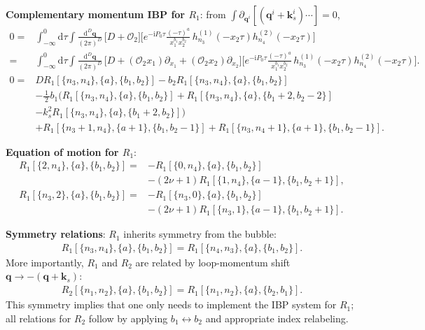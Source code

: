 \documentclass[a4paper,12pt]{article}
\newcommand{\FR}[2]{\displaystyle\frac{\,{#1}\,}{#2}}
\def\di{{\mathrm{d}}}
\def\pd{\partial}
\def\ii{\mathrm{i}}
\def\to{\rightarrow}
\begin{document}
\textbf{Complementary momentum IBP for $R_1$}:
from $\int \pd_{\bm q^i}[(\bm q^i+\bm k_s^i)\cdots]=0$,
\begin{align}
	0 ={}& \int_{-\infty}^0 \di\tau\int \FR{\di^D \bm q}{(2\pi)^D}\,
	\Big[D+\mathcal{O}_2\Big]\Bigg[
	e^{-\ii P_0\tau}\frac{(-\tau)^{a}}{x_1^{b_1}x_2^{b_2}}\,
	h_{n_3}^{(1)}(-x_2\tau)h_{n_4}^{(2)}(-x_2\tau)\Bigg] \nonumber\\
	={}& \int_{-\infty}^0 \di\tau\int \FR{\di^D \bm q}{(2\pi)^D}\,
	\Big[D+(\mathcal{O}_2 x_1)\partial_{x_1}+(\mathcal{O}_2 x_2)\partial_{x_2}\Big]\Bigg[
	e^{-\ii P_0\tau}\frac{(-\tau)^{a}}{x_1^{b_1}x_2^{b_2}}\,
	h_{n_3}^{(1)}(-x_2\tau)h_{n_4}^{(2)}(-x_2\tau)\Bigg]. \label{eq:R1momIBP2_chainrule}
\end{align}
\begin{align}
	0 = & D R_1[\{n_3,n_4\},\{a\},\{b_1,b_2\}] - b_2 R_1[\{n_3,n_4\},\{a\},\{b_1,b_2\}] \nonumber                    \\
	    & - \FR12 b_1\Big( R_1[\{n_3,n_4\},\{a\},\{b_1,b_2\}] + R_1[\{n_3,n_4\},\{a\},\{b_1+2,b_2-2\}] \nonumber     \\
	    & -k_s^2 R_1[\{n_3,n_4\},\{a\},\{b_1+2,b_2\}] \Big) \nonumber                                                \\
	    & + R_1[\{n_3+1,n_4\},\{a+1\},\{b_1,b_2-1\}] + R_1[\{n_3,n_4+1\},\{a+1\},\{b_1,b_2-1\}]. \label{eq:R1momIBP2}
\end{align}

\textbf{Equation of motion for $R_1$}:
\begin{align}
	R_1[\{2,n_4\},\{a\},\{b_1,b_2\}] = & - R_1[\{0,n_4\},\{a\},\{b_1,b_2\}] \nonumber                            \\
	                                   & - (2\nu+1) R_1[\{1,n_4\},\{a-1\},\{b_1,b_2+1\}], \label{eq:R1eom1} \\
	R_1[\{n_3,2\},\{a\},\{b_1,b_2\}] = & - R_1[\{n_3,0\},\{a\},\{b_1,b_2\}] \nonumber                            \\
	                                   & - (2\nu+1) R_1[\{n_3,1\},\{a-1\},\{b_1,b_2+1\}]. \label{eq:R1eom2}
\end{align}

\textbf{Symmetry relations}: $R_1$ inherits symmetry from the bubble:
\begin{align}
	 R_1[\{n_3,n_4\},\{a\},\{b_1,b_2\}] = R_1[\{n_4,n_3\},\{a\},\{b_1,b_2\}] \label{eq:R1sym}. 
\end{align}	 
	 More importantly, $R_1$ and $R_2$ are related by loop-momentum shift $\bm q \to -(\bm q+\bm k_s)$:
\begin{align}
	R_2[\{n_1,n_2\},\{a\},\{b_1,b_2\}] = R_1[\{n_1,n_2\},\{a\},\{b_2,b_1\}]. \label{eq:R1R2sym}
\end{align}
This symmetry implies that one only needs to implement the IBP system for $R_1$; all relations for $R_2$ follow by applying $b_1\leftrightarrow b_2$ and appropriate index relabeling.
\end{document}
